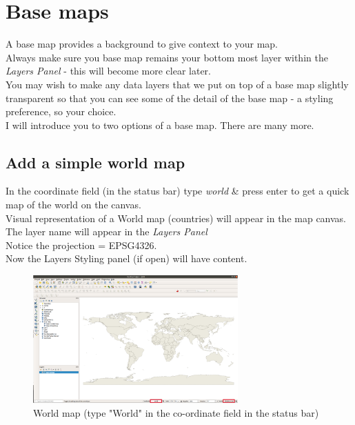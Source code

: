\chapter{Base maps}

\pagestyle{fancy}
\fancyhf{}
\fancyhead[OC]{\leftmark}
\fancyhead[EC]{\rightmark}
\cfoot{\thepage}


A base map provides a background to give context to your map.\\

Always make sure you base map remains your bottom most layer within the \textit{Layers Panel} - this will become more clear later.\\

You may wish to make any data layers that we put on top of a base map slightly transparent so that you can see some of the detail of the base map - a styling preference, so your choice.\\

I will introduce you to two options of a base map. There are many more.\\

\section{Add a simple world map}

In the coordinate field (in the status bar) type \textit{world} \& press enter to get a quick map of the world on the canvas.\\

Visual representation of a World map (countries) will appear in the map canvas.\\
The layer name will appear in the \textit{Layers Panel}\\
Notice the projection = EPSG4326.\\
Now the Layers Styling panel (if open) will have content.\\

\begin{figure}[!h]
	\centering
	\includegraphics[width=0.7\textwidth]{images/coordinate_field_world.png}
	\caption{World map (type "World" in the co-ordinate field in the status bar)}
	\label{ft_fig_firstfig3}
\end{figure}

